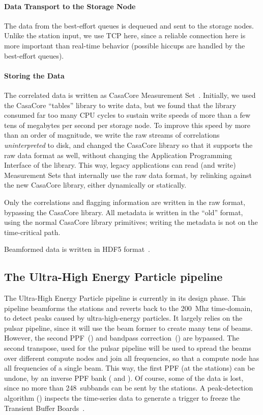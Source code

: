 \paragraph{Data Transport to the Storage Node }
The data from the best-effort queues is dequeued and sent to the storage nodes.
Unlike the station input, we use TCP here, since a reliable connection here
is more important than real-time behavior (possible hiccups are handled by
the best-effort queues).


\paragraph{Storing the Data }
The correlated data is written as CasaCore Measurement Set~\cite{Kemball:00}.
Initially, we used the CasaCore ``tables'' library to write data, but we
found that the library consumed far too many CPU cycles to sustain write
speeds of more than a few tens of megabytes per second per storage node.
To improve this speed by more than an order of magnitude, we write the
raw streams of correlations \emph{uninterpreted\/} to disk, and changed
the CasaCore library so that it supports the raw data format as well,
without changing the Application Programming Interface of the library.
This way, legacy applications can read (and write) Measurement Sets that
internally use the raw data format, by relinking against the new CasaCore
library, either dynamically or statically.

Only the correlations and flagging information are written in the raw
format, bypassing the CasaCore library.
All metadata is written in the ``old'' format, using the normal CasaCore
library primitives; writing the metadata is not on the time-critical path.

Beamformed data is written in HDF5 format~\cite{?}.



\subsection{The Ultra-High Energy Particle pipeline}

The Ultra-High Energy Particle pipeline is currently in its design phase.
This pipeline beamforms the stations and reverts back to the 200~Mhz
time-domain, to detect peaks caused by ultra-high-energy particles.
It largely relies on the pulsar pipeline, since it will use the beam former
to create many tens of beams.
However, the second PPF~() and bandpass
correction~() are bypassed.
The second transpose, used for the pulsar pipeline will be used to spread the
beams over different compute nodes and join all frequencies, so that a compute
node has all frequencies of a single beam.
This way, the first PPF (at the stations) can be undone, by an inverse PPF bank
( and ).
Of course, some of the data is lost, since no more than 248~subbands can be
sent by the stations.
A peak-detection algorithm () inspects the time-series data
to generate a trigger to freeze the Transient Buffer Boards~\cite{Kooistra:10}.



